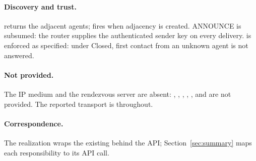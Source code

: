 \paragraph{Discovery and trust.}
 returns the adjacent agents;  fires when adjacency is created.  ANNOUNCE is subsumed: the router supplies the authenticated sender key on every delivery.   is enforced as specified: under Closed, first contact from an unknown agent is not answered.

\paragraph{Not provided.}
The IP medium and the rendezvous server are absent: , , , , , and  are not provided.  The reported transport is  throughout.

\paragraph{Correspondence.}
The realization wraps the existing  behind the API; Section~\ref{sec:summary} maps each  responsibility to its API call.
